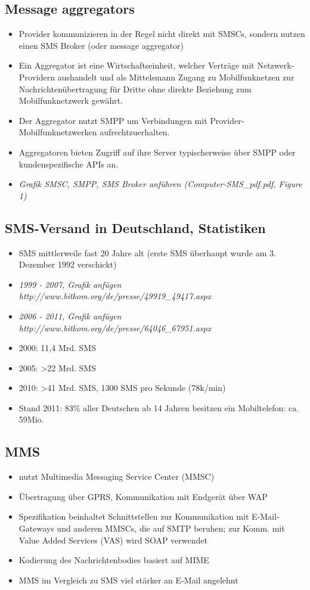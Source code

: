\documentclass[german,12pt,a4paper]{article}
\begin{document}
\subsection{Message aggregators}
\begin{itemize}
	\item Provider kommunizieren in der Regel nicht direkt mit SMSCs, sondern nutzen einen SMS Broker (oder message aggregator)
	\item Ein Aggregator ist eine Wirtschaftseinheit, welcher Verträge mit Netzwerk-Providern aushandelt und als Mittelsmann
		Zugang zu Mobilfunknetzen zur Nachrichtenübertragung für Dritte ohne direkte Beziehung zum Mobilfunknetzwerk gewährt. 
	\item Der Aggregator nutzt SMPP um Verbindungen mit Provider-Mobilfunknetzwerken aufrechtzuerhalten.
	\item Aggregatoren bieten Zugriff auf ihre Server typischerweise über SMPP oder kundenspezifische APIs an.
	\item \textit{Grafik SMSC, SMPP, SMS Broker anführen (Computer-SMS\_pdf.pdf, Figure 1)}
\end{itemize}

\subsection{SMS-Versand in Deutschland, Statistiken}
\begin{itemize}
	\item SMS mittlerweile fast 20 Jahre alt (erste SMS überhaupt wurde am 3. Dezember 1992 verschickt)
	\item \textit{1999 - 2007, Grafik anfügen http://www.bitkom.org/de/presse/49919\_49417.aspx}
	\item \textit{2006 - 2011, Grafik anfügen http://www.bitkom.org/de/presse/64046\_67951.aspx}
	\item 2000: 11,4 Mrd. SMS
	\item 2005: \textgreater 22 Mrd. SMS
	\item 2010: \textgreater 41 Mrd. SMS, 1300 SMS pro Sekunde (78k/min)
	\item Stand 2011: 83\% aller Deutschen ab 14 Jahren besitzen ein Mobiltelefon: ca. 59Mio.
\end{itemize}

\subsection{MMS}
\begin{itemize}
	\item nutzt Multimedia Messaging Service Center (MMSC)
	\item Übertragung über GPRS, Kommunikation mit Endgerät über WAP
	\item Spezifikation beinhaltet Schnittstellen zur Kommunikation mit E-Mail-Gateways und anderen MMSCs, die auf 
		SMTP beruhen; zur Komm. mit Value Added Services (VAS) wird SOAP verwendet
	\item Kodierung des Nachrichtenbodies basiert auf MIME
	\item MMS im Vergleich zu SMS viel stärker an E-Mail angelehnt
\end{itemize}
\end{document}
